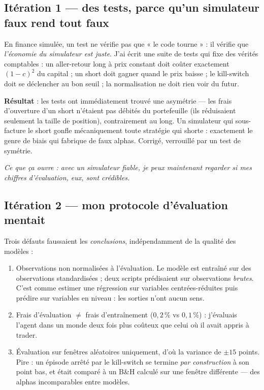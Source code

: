 \documentclass[11pt,a4paper]{article}
\newcommand{\ko}[1]{\textcolor{kored}{#1}}
\begin{document}
\subsection{Itération 1 --- des tests, parce qu'un simulateur faux rend tout faux}

En finance simulée, un test ne vérifie pas que « le code tourne » : il vérifie que
\emph{l'économie du simulateur est juste}. J'ai écrit une suite de tests qui fixe des
vérités comptables : un aller-retour long à prix constant doit coûter exactement
$(1-c)^2$ du capital ; un short doit gagner quand le prix baisse ; le kill-switch doit
se déclencher au bon seuil ; la normalisation ne doit rien voir du futur.

\textbf{Résultat} : les tests ont immédiatement trouvé une asymétrie --- \ko{les frais
d'ouverture d'un short n'étaient pas débités du portefeuille} (ils réduisaient
seulement la taille de position), contrairement au long. Un simulateur qui sous-facture
le short gonfle mécaniquement toute stratégie qui shorte : exactement le genre de biais
qui fabrique de faux alphas. Corrigé, verrouillé par un test de symétrie.

\emph{Ce que ça ouvre : avec un simulateur fiable, je peux maintenant regarder si mes
chiffres d'évaluation, eux, sont crédibles.}

\subsection{Itération 2 --- mon protocole d'évaluation mentait}
\label{sec:iter2}

Trois défauts faussaient les \emph{conclusions}, indépendamment de la qualité des
modèles :

\begin{enumerate}[itemsep=3pt]
  \item \ko{Observations non normalisées à l'évaluation.} Le modèle est entraîné sur
        des observations standardisées ; deux scripts prédisaient sur observations
        \emph{brutes}. C'est comme estimer une régression sur variables
        centrées-réduites puis prédire sur variables en niveau : les sorties n'ont
        aucun sens.
  \item \ko{Frais d'évaluation $\ne$ frais d'entraînement} ($0{,}2\,\%$ vs $0{,}1\,\%$) :
        j'évaluais l'agent dans un monde deux fois plus coûteux que celui où il avait
        appris à trader.
  \item \ko{Évaluation sur fenêtres aléatoires uniquement}, d'où la variance de
        $\pm 15$ points. Pire : un épisode arrêté par le kill-switch se termine
        \emph{par construction} à son point bas, et était comparé à un B\&H calculé sur
        une fenêtre différente --- des alphas incomparables entre modèles.
\end{enumerate}
\end{document}
